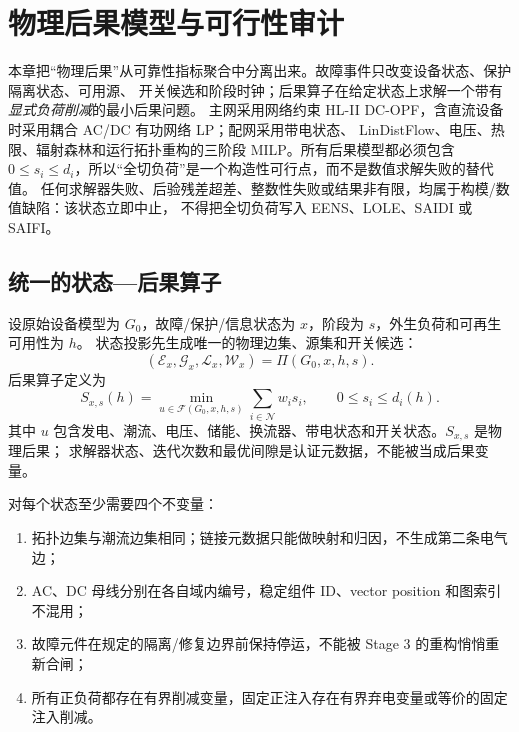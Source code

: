 
\section{物理后果模型与可行性审计}
\label{sec:rel-physical-consequence}

\begin{theorynote}
本章把“物理后果”从可靠性指标聚合中分离出来。故障事件只改变设备状态、保护隔离状态、可用源、
开关候选和阶段时钟；后果算子在给定状态上求解一个带有\emph{显式负荷削减}的最小后果问题。
主网采用网络约束 HL-II DC-OPF，含直流设备时采用耦合 AC/DC 有功网络 LP；配网采用带电状态、
LinDistFlow、电压、热限、辐射森林和运行拓扑重构的三阶段 MILP。所有后果模型都必须包含
$0\le s_i\le d_i$，所以“全切负荷”是一个构造性可行点，而不是数值求解失败的替代值。
任何求解器失败、后验残差超差、整数性失败或结果非有限，均属于构模/数值缺陷：该状态立即中止，
不得把全切负荷写入 EENS、LOLE、SAIDI 或 SAIFI。
\end{theorynote}

\subsection{统一的状态—后果算子}
设原始设备模型为 $G_0$，故障/保护/信息状态为 $x$，阶段为 $s$，外生负荷和可再生可用性为 $h$。
状态投影先生成唯一的物理边集、源集和开关候选：
\begin{equation}
 (\mathcal E_x,\mathcal G_x,\mathcal L_x,\mathcal W_x)
 =\Pi(G_0,x,h,s).
 \label{eq:physical-projection}
\end{equation}
后果算子定义为
\begin{equation}
 S_{x,s}(h)=\min_{u\in\mathcal F(G_0,x,h,s)}\sum_{i\in\mathcal N}w_i s_i,
 \qquad 0\le s_i\le d_i(h).
 \label{eq:physical-consequence-operator}
\end{equation}
其中 $u$ 包含发电、潮流、电压、储能、换流器、带电状态和开关状态。$S_{x,s}$ 是物理后果；
求解器状态、迭代次数和最优间隙是认证元数据，不能被当成后果变量。

对每个状态至少需要四个不变量：
\begin{enumerate}
  \item 拓扑边集与潮流边集相同；链接元数据只能做映射和归因，不生成第二条电气边；
  \item AC、DC 母线分别在各自域内编号，稳定组件 ID、vector position 和图索引不混用；
  \item 故障元件在规定的隔离/修复边界前保持停运，不能被 Stage 3 的重构悄悄重新合闸；
  \item 所有正负荷都存在有界削减变量，固定正注入存在有界弃电变量或等价的固定注入削减。
\end{enumerate}

